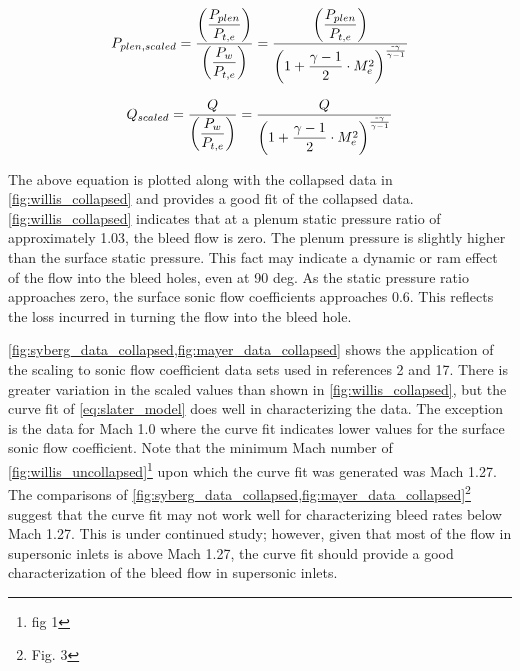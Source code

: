 \begin{equation} P_{plen,scaled} = \dfrac{\qty(\dfrac{P_{plen}}{P_{t,e}})}{\qty(\dfrac{P_w}{P_{t,e}})} = \dfrac{\qty(\dfrac{P_{plen}}{P_{t,e}})}{\qty(1+\dfrac{\gamma-1}{2}\cdot M^2_e)^{\frac{\texttt{-}\gamma}{\gamma-1}}} 
	\label{eq:slater_p_scaling} \end{equation}


\begin{equation} Q_{scaled} = \dfrac{Q}{\qty(\dfrac{P_w}{P_{t,e}})} = \dfrac{Q}{\qty(1+\dfrac{\gamma-1}{2}\cdot M^2_e)^{\frac{\texttt{-}\gamma}{\gamma-1}}} 
	\label{eq:slater_q_scaling} \end{equation}

The above equation is plotted along with the collapsed data in \cref{fig:willis_collapsed} and provides a good fit of the collapsed data. \cref{fig:willis_collapsed} indicates that at a plenum static pressure ratio of approximately 1.03, the bleed flow is zero. The plenum pressure is slightly higher than the surface static pressure. This fact may indicate a dynamic or ram effect of the flow into the bleed holes, even at 90 deg. As the static pressure ratio approaches zero, the surface sonic flow coefficients approaches 0.6. This reflects the loss incurred in turning the flow into the bleed hole.

\cref{fig:syberg_data_collapsed,fig:mayer_data_collapsed} shows the application of the scaling to sonic flow coefficient data sets used in references 2 and 17. There is greater variation in the scaled values than shown in \cref{fig:willis_collapsed}, but the curve fit of \cref{eq:slater_model} does well in characterizing the data. The exception is the data for Mach 1.0 where the curve fit indicates lower values for the surface sonic flow coefficient. Note that the minimum Mach number of \cref{fig:willis_uncollapsed}\footnote{fig 1} upon which the curve fit was generated was Mach 1.27. The comparisons of \cref{fig:syberg_data_collapsed,fig:mayer_data_collapsed}\footnote{Fig. 3} suggest that the curve fit may not work well for characterizing bleed rates below Mach 1.27. This is under continued study; however, given that most of the flow in supersonic inlets is above Mach 1.27, the curve fit should provide a good characterization of the bleed flow in supersonic inlets.

